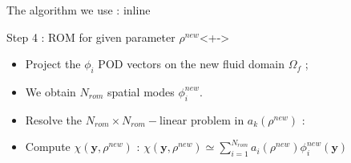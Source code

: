 \begin{frame}{The algorithm we use : inline}
%
\begin{block}{Step 4 : ROM for given parameter $\rho^{new}$}<+->
\begin{itemize}
\item<+-> Project the $\phi_i$ POD vectors on the new fluid domain $\Omega_f$ ;
\item<+-> We obtain $N_{rom}$ spatial modes $\phi_i^{new}$.
\item<+-> Resolve the $N_{rom}\times N_{rom}-$linear problem in $a_k(\rho^{new})$ :
\end{itemize}
\begin{itemize}
\item<+-> Compute $\chi(\mathbf{y},\rho^{new})$ : $\chi\left(\mathbf{y},\rho^{new}\right)\simeq \sum\limits_{i=1}^{N_{rom}} a_i \left(\rho^{new}\right)\phi_i^{new}(\mathbf{y})$
\end{itemize}
\end{block}
%
\end{frame}
